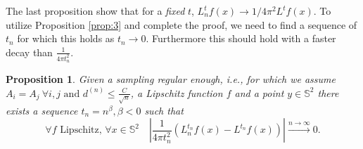 \documentclass{article} %
\newtheorem{prop}{Proposition}
\renewcommand{\S}{\mathbb{S}}
\newcommand{\linefrac}[2]{
    {#1/#2}
}
\begin{document}
The last proposition show that for a \emph{fixed} $t$, $L_n^tf(x)\rightarrow \linefrac{1}{4\pi^2} L^tf(x)$. To utilize Proposition \ref{prop:3} and complete the proof, we need to find a sequence of $t_n$ for which this holds as $t_n \rightarrow 0$. Furthermore this should hold with a faster decay than $\frac{1}{4\pi t_n^2}$.
\begin{prop}\label{prop:2}
	Given a sampling regular enough, i.e., for which we assume $A_i=A_j \ \forall i,j\text{ and }d^{(n)}\leq \frac{C}{\sqrt{n}}$, a Lipschitz function $f$ and a point $y\in\S^2$ there exists a sequence $t_n = n^\beta, \beta<0$ such that
\begin{equation*}
    \forall f \text{ Lipschitz, } \forall x\in\S^2 \quad \left|\frac{1}{4\pi t_n^2}\left(L_n^{t_n}f(x) -  L^{t_n}f(x)\right)\right|\xrightarrow{n\to \infty}0.
\end{equation*}
\end{prop}
\end{document}
